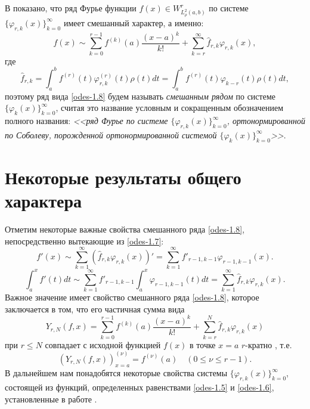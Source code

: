 В \cite{Shar20} показано,  что ряд Фурье функции $f(x)\in W^r_{L^2_\rho(a,b)}$ по системе  $\{\varphi_{r,k}(x)\}_{k=0}^\infty$ имеет смешанный характер, а именно:
  \begin{equation}\label{odes-1.8}
f(x)\sim \sum_{k=0}^{r-1} f^{(k)}(a)\frac{(x-a)^k}{k!}+ \sum_{k=r}^\infty \hat f_{r,k}\varphi_{r,k}(x),
\end{equation}
где
  \begin{equation}\label{odes-1.9}
 \hat f_{r,k}=\int_a^b f^{(r)}(t) \varphi^{(r)}_{r,k}(t)\rho(t)dt=\int_a^b f^{(r)}(t) \varphi_{k-r}(t)\rho(t)dt,
\end{equation}
поэтому ряд  вида \eqref{odes-1.8} будем  называть \textit{ смешанным рядом} по  системе $\{\varphi_{k}(x)\}_{k=0}^\infty$, считая это название условным и сокращенным обозначением полного названия: \textit{<<ряд Фурье по системе  $\{\varphi_{r,k}(x)\}_{k=0}^\infty$, ортонормированной по Соболеву, порожденной ортонормированной системой $\{\varphi_{k}(x)\}_{k=0}^\infty$>>}.


\section{Некоторые результаты общего характера }
Отметим некоторые важные свойства смешанного ряда \eqref{odes-1.8}, непосредственно вытекающие из \eqref{odes-1.7}:
\begin{equation}\label{odes-2.1}
f'(x)\sim \sum_{k=1}^\infty (\hat f_{r,k}\varphi_{r,k}(x))'= \sum_{k=1}^\infty f'_{r-1,k-1}\varphi_{r-1,k-1}(x).
\end{equation}
\begin{equation}\label{odes-2.2}
\int_a^xf'(t)dt\sim \sum_{k=1}^\infty f'_{r-1,k-1}\int_a^x\varphi_{r-1,k-1}(t)dt=\sum_{k=1}^\infty \hat f_{r,k}\varphi_{r,k}(x).
\end{equation}
Важное значение имеет свойство  смешанного ряда \eqref{odes-1.8}, которое заключается в том, что его частичная сумма вида
\begin{equation}\label{odes-2.3}
Y_{r,N}(f,x)=\sum_{k=0}^{r-1} f^{(k)}(a)\frac{(x-a)^k}{k!}+ \sum_{k=r}^{N} \hat f_{r,k}\varphi_{r,k}(x)
\end{equation}
 при   $r\le N$  совпадает с исходной функцией $f(x)$   в точке $x=a$ $r$-кратно , т.е.
\begin{equation}\label{odes-2.4}
(Y_{r,N}(f,x))^{(\nu)}_{x=a}=f^{(\nu)}(a)\quad (0\le\nu\le r-1).
\end{equation}
 В дальнейшем нам понадобятся  некоторые  свойства системы $\{\varphi_{r,k}(x)\}_{k=0}^\infty$, состоящей из функций, определенных равенствами   \eqref{odes-1.5} и \eqref{odes-1.6}, установленные в работе \cite{Shar20}.

